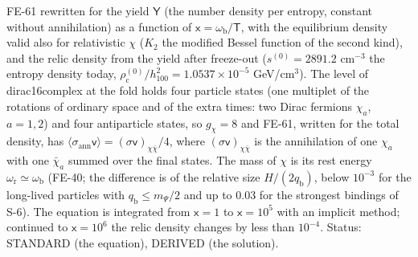 \documentclass[
  10pt,
]{article}
\begin{document}
FE-61 rewritten for the yield \(\mathsf{Y}\) (the number density per
entropy, constant without annihilation) as a function of
\(\mathsf{x} = \omega_{\mathrm{b}}/\mathsf{T}\), with the equilibrium
density valid also for relativistic \(\chi\) (\(K_2\) the modified
Bessel function of the second kind), and the relic density from the
yield after freeze-out (\(s^{(0)} = 2891.2\) cm\(^{-3}\) the entropy
density today,
\(\rho_{\mathrm{c}}^{(0)}/h_{100}^2 = 1.0537\times10^{-5}\)
GeV/cm\(^3\)). The level of dirac16complex at the fold holds four
particle states (one multiplet of the rotations of ordinary space and of
the extra times: two Dirac fermions \(\chi_a\), \(a = 1, 2\)) and four
antiparticle states, so \(g_\chi = 8\) and FE-61, written for the total
density, has
\(\langle\sigma_{\mathrm{ann}}\mathsf{v}\rangle = (\sigma\mathsf{v})_{\chi\bar\chi}/4\),
where \((\sigma\mathsf{v})_{\chi\bar\chi}\) is the annihilation of one
\(\chi_a\) with one \(\bar\chi_a\) summed over the final states. The
mass of \(\chi\) is its rest energy
\(\omega_{\mathrm{r}} \simeq \omega_{\mathrm{b}}\) (FE-40; the
difference is of the relative size \(H/(2q_{\mathrm{b}})\), below
\(10^{-3}\) for the long-lived particles with
\(q_{\mathrm{b}} \le m_\Psi/2\) and up to 0.03 for the strongest
bindings of S-6). The equation is integrated from \(\mathsf{x} = 1\) to
\(\mathsf{x} = 10^5\) with an implicit method; continued to
\(\mathsf{x} = 10^6\) the relic density changes by less than
\(10^{-4}\). Status: STANDARD (the equation), DERIVED (the solution).
\end{document}
